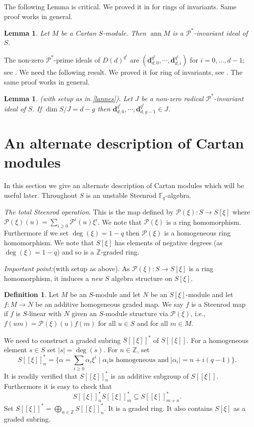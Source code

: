 \documentclass{amsart}
\newcommand{\F}{\mathbb{F} }
\newcommand{\Z}{\mathbb{Z} }
\newcommand{\Pc}{\mathcal{P} }
\newcommand{\db}{\mathbf{d} }
\newcommand{\rt}{\rightarrow}
\newcommand{\ann}{\operatorname{ann}}
\theoremstyle{plain}
\newtheorem{lemma}[theorem]{Lemma}
\theoremstyle{definition}
\newtheorem{definition}[theorem]{Definition}
\theoremstyle{remark}
\begin{document}
The following Lemma is critical. We proved  it in \cite[3.5]{P} for rings of invariants. Same proof works in general.
\begin{lemma}\label{ann-p*}
Let $M$ be a Cartan $S$-module. Then $\ann M$ is a $\Pc^*$-invariant ideal of $S$.
\end{lemma}


\s \label{dickson} The non-zero $\Pc^*$-prime ideals of $D(d)^{q^t}$  are $(\db_{d,0}^{q^t}, \cdots, \db_{d,i}^{q^t})$ for $i = 0, \ldots, d -1$; see \cite[9.2.7]{NS}.
We need the following result. We proved it for ring of invariants, see \cite[2.8]{P}. The same proof works in general.
\begin{lemma}\label{bella}
(with setup as in \ref{lannes}). Let $J$ be a non-zero  radical $\Pc^*$-invariant ideal of $S$. If $\dim S/J = d - g$ then $\db_{d,0}^{q^t}, \cdots, \db_{d, g -1}^{q^t} \in J$.
\end{lemma}

\section{An alternate description of Cartan modules}
In this section we give an alternate description of Cartan modules  which will be useful later.
Throughout $S$ is an unstable Steenrod $\F_q$-algebra.

\s \emph{The total Steenrod operation}. This is the map defined by $\Pc(\xi) \colon S \rt S[\xi]$ where $\Pc(\xi)(u) = \sum_{i \geq 0}\Pc^i(u)\xi^i$.
We note that $\Pc(\xi)$ is a ring homomorphism. Furthermore if we set $\deg(\xi) = 1-q$ then $\Pc(\xi)$ is a homogeneous ring homomorphism.
We note that $S[\xi]$ has elements of negative degrees (as $\deg(\xi) = 1-q$)  and so is a $\Z$-graded ring.

\s \emph{Important point:}(with setup as above). As $\Pc(\xi) \colon S \rt S[\xi]$ is a ring homomorphism, it induces a \emph{new} $S$ algebra structure on $S[\xi]$.

\begin{definition}
  Let $M$ be an $S$-module and let $N$ be an $S[\xi]$-module and let $f\colon M \rt N$ be an additive homogeneous graded map. We say $f$ is a Steenrod map if $f$ is $S$-linear with $N$ given an $S$-module structure via $\Pc(\xi)$, i.e., $f(u m) = \Pc(\xi)(u)f(m)$ for all $u\in S$ and  for all $m \in M$.
\end{definition}

\s We need to construct a graded subring $S[[\xi]]^*$ of $S[[\xi]]$.  For a homogeneous element $s \in S$ set $|s| =\deg(s)$.
For $n \in \Z$, set
\[
S[[\xi]]^*_n = \{\alpha =  \sum_{i \geq 0} \alpha_i \xi^i \mid  \alpha_i \text{is homogeneous and} \ |\alpha_i| = n + i(q-1)\}.
\]
It is readily verified that $S[[\xi]]^*_n$ is an additive subgroup of $S[[\xi]]$. Furthermore it is easy to check that
$$ S[[\xi]]^*_n S[[\xi]]^*_m \subseteq S[[\xi]]^*_{m+n}.$$
Set $S[[\xi]]^* = \bigoplus_{n \in \Z}S[[\xi]]^*_n $. It is a graded ring. It also contains $S[\xi]$ as a graded subring.
\end{document}
